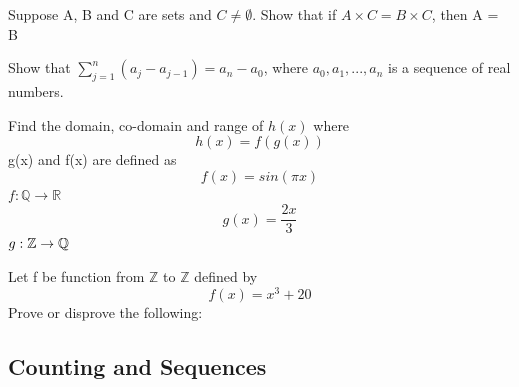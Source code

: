 \documentclass[addpoints]{exam}
\begin{document}
\begin{questions}
\question 
Suppose A, B and C are sets and $ C \neq \emptyset $. Show that if $ A \times C = B \times C $, then A = B


\question
Show that $\sum_{j = 1}^{n} (a_j - a_{j-1}) = a_n - a_0 $, where
$a_0, a_1,...,a_n$ is a sequence of real numbers.



\question
Find the domain, co-domain and range of $h(x)$ where \[h(x) = f(g(x))\]
g(x) and f(x) are defined as \[f(x)=sin(\pi x) \] \hfill $f:\mathbb{Q}\to\mathbb R$
\[g(x) = \frac{2 x}{3} \] $\hfill g:\mathbb{Z}\to\mathbb{Q}$


\question
Let f be function from $\mathbb{Z}$ to $\mathbb{Z}$ defined by
\[f(x) = x^3 + 20\]
Prove or disprove the following:
\end{questions}



\subsection{\huge Counting and Sequences}
\end{document}
